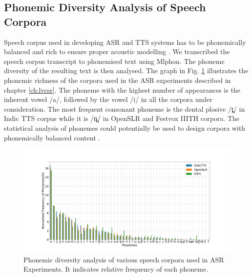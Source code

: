 

\subsection{Phonemic Diversity Analysis of Speech Corpora}

Speech corpus used in developing ASR and TTS systems has to be phonemically
balanced and rich to ensure proper acoustic modelling
\cite{malviya2016structural}. We transcribed the speech corpus transcript to
phonemised text using Mlphon. The phoneme diversity of the resulting text is
then analysed. The graph in Fig. \ref{phoneticrichness} illustrates the
phonemic richness of the corpora used in the ASR experiments described in
chapter \ref{ch:lvcsr}. The phoneme with the highest number of appearances is the
inherent vowel {\ipa /a/}, followed by the vowel {\ipa /i/} in all the corpora
under consideration. The most frequent consonant phoneme is the dental plosive
	{\ipa /t̪/} in Indic TTS \cite{baby2016resources} corpus while it is {\ipa /n̪/}
in OpenSLR \cite{he-etal-2020-open} and Festvox IIITH \cite{prahallad2012iiit}
corpora. The statistical analysis of phonemes could potentially be used to
design corpora with phonemically balanced content \cite{torres2019emilia}.

\begin{figure}[htpb]
	\centering
	\includegraphics[width=\linewidth, trim=1cm 1cm 2cm 2cm,clip]{phoneticrichness.jpg}
	\caption{Phonemic diversity analysis of various speech corpora used in ASR Experiments. It indicates relative frequency of each phoneme.}
	\label{phoneticrichness}
\end{figure}

